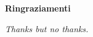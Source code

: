 \thispagestyle{empty}

\begin{center}
  {\bf \Huge Ringraziamenti}
\end{center}

\vspace{4cm}


\emph{
  Thanks but no thanks.
}
